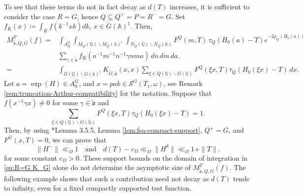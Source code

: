 \documentclass[12pt]{amsart}
\theoremstyle{definition}
\theoremstyle{plain}
\theoremstyle{remark}
\def\Q{\mathbb{Q}}%
\def\A{\mathbb{A}}%
\def\bs{\backslash}%
\newcommand{\cS}{\mathcal{S}}
\numberwithin{equation}{section}
\newcommand{\tG}{\widetilde{G}}
\newcommand{\tfo}{\widetilde{\mathfrak{o}}}
\begin{document}
To see that these terms do not in fact decay as $d(T)$ increases, 
it is sufficient to consider the case $R=G$, hence $Q\subsetneq Q^+=P=R^-=G$. 
Set $f_K(x)\coloneqq \int_{K}f(k^{-1}xk)d k$, $x\in\tG(\A)^1$. 
Then, 
\begin{align}\label{eq:R=G}
     M_{\tfo,Q,G}^T(f)
 ={}&\int_{A_Q^G}\int_{M_Q(\Q)\backslash M_Q(\A)^1} \int_{N_Q(\Q)\backslash N_Q(\A)} F^Q(m,T)\, \tau_Q(H_0(a)-T)
                           e^{-2\rho_{Q}(H_0(a))}\\
    &
        \sum_{\gamma\in\tfo} f_K(a^{-1}m^{-1}n^{-1}\gamma nma)
          \,dn \, dm \, da. \nonumber \\
    ={}& \int_{G(\Q)\bs G(\A)^1} K_{\tG,\tfo}(x,x) \sum_{\xi\in Q(\Q)\bs G(\Q)} F^Q(\xi x,T)\tau_Q(H_0(\xi x)-T)\, dx. \label{eq:R=G K_G}
\end{align}
Let $a=\exp(H)\in A_0^G$, and $x=pak\in \cS^G(T_1,\omega)$, see Remark \ref{rem:truncation-Arthur-compatibility} for the notation. 
Suppose that $f(x^{-1}\gamma x)\neq 0$ for some $\gamma\in \tfo$ and 
\[
\sum_{\xi\in Q(\Q)\bs G(\Q)} F^Q(\xi x,T)\tau_Q(H_0(\xi x)-T)=1.
\]
Then, by using \cite{LW13}*{Lemma 3.5.5}, Lemma \ref{lem:fsa-compact-support}, $Q^+=G$, and $F^G(x,T)=0$, we can prove that
\begin{equation}\label{eq:R=Gbound}
 \|H^-\|\ll_\Omega 1   \quad \text{and} \quad   d(T)-c_\Omega \ll_\Omega \|H^\theta \| \ll_\Omega 1+\|T\|.
\end{equation}
for some constant $c_\Omega >0$. 
These support bounds on the domain of integration in \eqref{eq:R=G K_G} alone do not determine the asymptotic size of $M_{\tfo,Q,G}^T(f)$. 
The following example shows that such a contribution need not decay as $d(T)$ tends to infinity, even for a fixed compactly supported test function.
\end{document}
